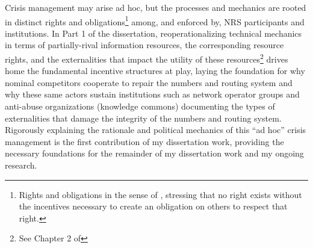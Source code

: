 \documentclass[12pt,journal,compsoc,letterpaper,onecolumn,twoside]{IEEEtran}
\begin{document}
Crisis management may arise ad hoc, but the processes and mechanics
are rooted in  
distinct rights and obligations\footnote{Rights and obligations in the
  sense of , stressing that no right
  exists without the incentives necessary to create an obligation on
  others to respect that right.}
among, and enforced by, NRS participants and institutions.   
%
In Part 1 of the dissertation, reoperationalizing technical mechanics
in terms of partially-rival information resources, the corresponding
resource rights, 
and the externalities that impact the utility of these
resources\footnote{See Chapter 2 of }
drives home the fundamental incentive structures at play, laying the
foundation for why nominal competitors cooperate to repair the
numbers and routing system and why these same actors sustain
institutions such as network operator groups and anti-abuse
organizations (knowledge commons) documenting the types of
externalities that damage the integrity of the numbers and routing system.
%
Rigorously explaining the rationale and political mechanics of this
``ad hoc'' crisis 
management is the first contribution of my dissertation work,
providing the necessary foundations for the remainder of my
dissertation work and my ongoing research.
%
%
\end{document}
